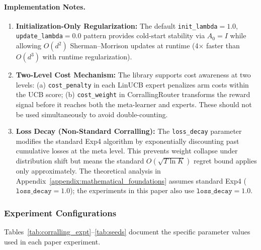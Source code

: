 \paragraph{Implementation Notes.}
\begin{enumerate}[leftmargin=*,noitemsep]
    \item \textbf{Initialization-Only Regularization:} The default
    \texttt{init\_lambda}$=1.0$, \texttt{update\_lambda}$=0.0$ pattern provides
    cold-start stability via $A_0 = I$ while allowing $O(d^2)$ Sherman--Morrison
    updates at runtime (4$\times$ faster than $O(d^3)$ with runtime regularization).

    \item \textbf{Two-Level Cost Mechanism:} The library supports cost awareness at
    two levels: (a) \texttt{cost\_penalty} in each LinUCB expert penalizes arm costs
    within the UCB score; (b) \texttt{cost\_weight} in CorrallingRouter transforms
    the reward signal before it reaches both the meta-learner and experts.
    These should not be used simultaneously to avoid double-counting.

    \item \textbf{Loss Decay (Non-Standard Corralling):} The \texttt{loss\_decay}
    parameter modifies the standard Exp4 algorithm by exponentially discounting
    past cumulative losses at the meta level. This prevents weight collapse under
    distribution shift but means the standard $O(\sqrt{T \ln K})$ regret bound
    applies only approximately. The theoretical analysis in Appendix~\ref{appendix:mathematical_foundations}
    assumes standard Exp4 ($\texttt{loss\_decay}=1.0$); the experiments in this paper
    also use $\texttt{loss\_decay}=1.0$.
\end{enumerate}


\subsubsection{Experiment Configurations}

Tables~\ref{tab:corralling_expt}--\ref{tab:seeds} document the specific parameter
values used in each paper experiment.


